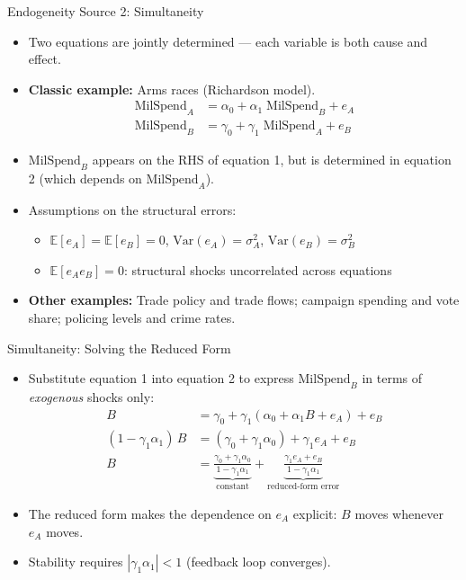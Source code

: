 \documentclass[aspectratio=169, handout]{beamer}
\numberwithin{equation}{section}
\begin{document}
\begin{frame}{Endogeneity Source 2: Simultaneity}
\begin{itemize}
\item Two equations are jointly determined --- each variable is both cause and effect.
\item \textbf{Classic example:} Arms races (Richardson model).
\begin{align*}
\text{MilSpend}_A &= \alpha_0 + \alpha_1\;\text{MilSpend}_B + e_A\\
\text{MilSpend}_B &= \gamma_0 + \gamma_1\;\text{MilSpend}_A + e_B
\end{align*}
\item $\text{MilSpend}_B$ appears on the RHS of equation 1, but is determined in equation 2 (which depends on $\text{MilSpend}_A$).
\item Assumptions on the structural errors:
\begin{itemize}
\item $\mathbb{E}[e_A]=\mathbb{E}[e_B]=0$, $\text{Var}(e_A)=\sigma_A^2$, $\text{Var}(e_B)=\sigma_B^2$
\item $\mathbb{E}[e_A e_B]=0$: structural shocks uncorrelated across equations
\end{itemize}
\item \textbf{Other examples:} Trade policy and trade flows; campaign spending and vote share; policing levels and crime rates.
\end{itemize}
\end{frame}


\begin{frame}{Simultaneity: Solving the Reduced Form}
\begin{itemize}
\item Substitute equation 1 into equation 2 to express $\text{MilSpend}_B$ in terms of \emph{exogenous} shocks only:
\begin{align*}
B &= \gamma_0 + \gamma_1(\alpha_0+\alpha_1 B + e_A) + e_B\\
(1-\gamma_1\alpha_1)\,B &= (\gamma_0+\gamma_1\alpha_0) + \gamma_1 e_A + e_B\\
B &= \underbrace{\frac{\gamma_0+\gamma_1\alpha_0}{1-\gamma_1\alpha_1}}_{\text{constant}} + \underbrace{\frac{\gamma_1 e_A + e_B}{1-\gamma_1\alpha_1}}_{\text{reduced-form error}}
\end{align*}
\item The reduced form makes the dependence on $e_A$ explicit: $B$ moves whenever $e_A$ moves.
\item Stability requires $|\gamma_1\alpha_1|<1$ (feedback loop converges).
\end{itemize}
\end{frame}
\end{document}

